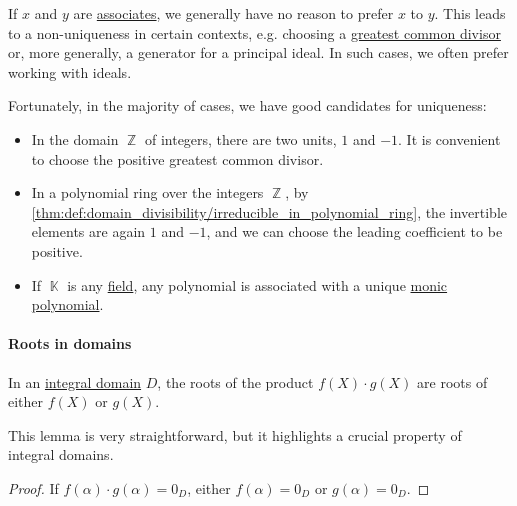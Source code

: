\begin{remark}\label{rem:choice_of_associates}
  If \( x \) and \( y \) are \hyperref[def:domain_divisibility/associates]{associates}, we generally have no reason to prefer \( x \) to \( y \). This leads to a non-uniqueness in certain contexts, e.g. choosing a \hyperref[def:gcd]{greatest common divisor} or, more generally, a generator for a principal ideal. In such cases, we often prefer working with ideals.

  Fortunately, in the majority of cases, we have good candidates for uniqueness:
  \begin{itemize}
    \item In the domain \( \BbbZ \) of integers, there are two units, \( 1 \) and \( -1 \). It is convenient to choose the positive greatest common divisor.

    \item In a polynomial ring over the integers \( \BbbZ \), by \cref{thm:def:domain_divisibility/irreducible_in_polynomial_ring}, the invertible elements are again \( 1 \) and \( -1 \), and we can choose the leading coefficient to be positive.

    \item If \( \BbbK \) is any \hyperref[def:field]{field}, any polynomial is associated with a unique \hyperref[def:monic_polynomial]{monic polynomial}.
  \end{itemize}
\end{remark}

\paragraph{Roots in domains}

\begin{lemma}\label{thm:roots_of_polynomial_product}
  In an \hyperref[def:integral_domain]{integral domain} \( D \), the roots of the product \( f(X) \cdot g(X) \) are roots of either \( f(X) \) or \( g(X) \).
\end{lemma}
\begin{comments}
  \item This lemma is very straightforward, but it highlights a crucial property of integral domains.
\end{comments}
\begin{proof}
  If \( f(\alpha) \cdot g(\alpha) = 0_D \), either \( f(\alpha) = 0_D \) or \( g(\alpha) = 0_D \).
\end{proof}

